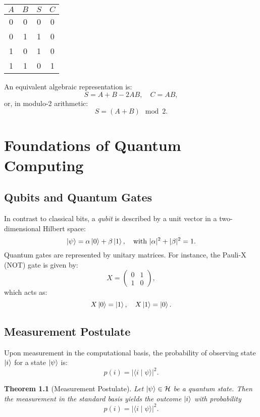 \documentclass[12pt]{book}
\newtheorem{theorem}{Theorem}[chapter]
\theoremstyle{remark}
\begin{document}
	\begin{center}
		\begin{tabular}{cc|cc}
			\(A\) & \(B\) & \(S\) & \(C\) \\ \hline
			0 & 0 & 0 & 0 \\
			0 & 1 & 1 & 0 \\
			1 & 0 & 1 & 0 \\
			1 & 1 & 0 & 1 \\
		\end{tabular}
	\end{center}
	
	An equivalent algebraic representation is:
	\[
	S = A + B - 2AB,\quad C = AB,
	\]
	or, in modulo-2 arithmetic:
	\[
	S = (A+B) \mod 2.
	\]
	
	\chapter{Foundations of Quantum Computing}
	\section{Qubits and Quantum Gates}
	In contrast to classical bits, a \emph{qubit} is described by a unit vector in a two-dimensional Hilbert space:
	\[
	\ket{\psi} = \alpha \ket{0} + \beta \ket{1}, \quad \text{with } |\alpha|^2 + |\beta|^2 = 1.
	\]
	Quantum gates are represented by unitary matrices. For instance, the Pauli-X (NOT) gate is given by:
	\[
	X = \begin{pmatrix} 0 & 1 \\ 1 & 0 \end{pmatrix},
	\]
	which acts as:
	\[
	X\ket{0} = \ket{1}, \quad X\ket{1} = \ket{0}.
	\]
	
	\section{Measurement Postulate}
	Upon measurement in the computational basis, the probability of observing state \(\ket{i}\) for a state \(\ket{\psi}\) is:
	\[
	p(i) = |\langle i \mid \psi \rangle|^2.
	\]
	
	\begin{theorem}[Measurement Postulate]
		Let \(\ket{\psi} \in \mathcal{H}\) be a quantum state. Then the measurement in the standard basis yields the outcome \(\ket{i}\) with probability
		\[
		p(i) = |\langle i \mid \psi \rangle|^2.
		\]
	\end{theorem}
	
\end{document}
